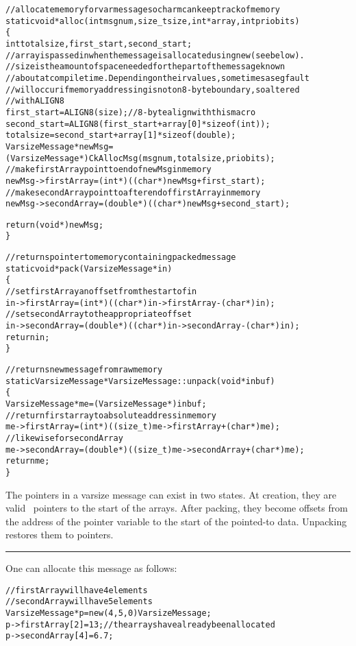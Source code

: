 \begin{alltt}
// allocate memory for varmessage so charm can keep track of memory
static void* alloc(int msgnum, size_t size, int* array, int priobits)
\{
  int totalsize, first_start, second_start;
  // array is passed in when the message is allocated using new (see below).
  // size is the amount of space needed for the part of the message known
  // about at compile time.  Depending on their values, sometimes a segfault
  // will occur if memory addressing is not on 8-byte boundary, so altered
  // with ALIGN8
  first_start = ALIGN8(size);  // 8-byte align with this macro
  second_start = ALIGN8(first_start + array[0]*sizeof(int));
  totalsize = second_start + array[1]*sizeof(double);
  VarsizeMessage* newMsg = 
    (VarsizeMessage*) CkAllocMsg(msgnum, totalsize, priobits);
  // make firstArray point to end of newMsg in memory
  newMsg->firstArray = (int*) ((char*)newMsg + first_start);
  // make secondArray point to after end of firstArray in memory
  newMsg->secondArray = (double*) ((char*)newMsg + second_start);

  return (void*) newMsg;
\}

// returns pointer to memory containing packed message
static void* pack(VarsizeMessage* in)
\{
  // set firstArray an offset from the start of in
  in->firstArray = (int*) ((char*)in->firstArray - (char*)in);
  // set secondArray to the appropriate offset
  in->secondArray = (double*) ((char*)in->secondArray - (char*)in);
  return in;
\}

// returns new message from raw memory
static VarsizeMessage* VarsizeMessage::unpack(void* inbuf)
\{
  VarsizeMessage* me = (VarsizeMessage*)inbuf;
  // return first array to absolute address in memory
  me->firstArray = (int*) ((size_t)me->firstArray + (char*)me);
  // likewise for secondArray
  me->secondArray = (double*) ((size_t)me->secondArray + (char*)me);
  return me;
\}
\end{alltt}
The pointers in a varsize message can exist in two states.  At creation, they
are valid \CC\ pointers to the start of the arrays.  After packing, they become
offsets from the address of the pointer variable to the start of the pointed-to
data.  Unpacking restores them to pointers. 
\hrule
\normalsize

One can allocate this  message as follows:

\begin{alltt}
// firstArray will have 4 elements
// secondArray will have 5 elements 
VarsizeMessage* p = new(4, 5, 0) VarsizeMessage;
p->firstArray[2] = 13;     // the arrays have already been allocated 
p->secondArray[4] = 6.7; 
\end{alltt}

